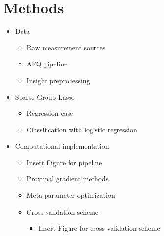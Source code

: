 \section{Methods}

\begin{itemize}
  \item Data
    \begin{itemize}
      \item Raw measurement sources
      \item AFQ pipeline
      \item Insight preprocessing
    \end{itemize}
  \item Sparse Group Lasso
    \begin{itemize}
      \item Regression case
      \item Classification with logistic regression
    \end{itemize}
  \item Computational implementation
    \begin{itemize}
      \item Insert Figure for pipeline
      \item Proximal gradient methods
      \item Meta-parameter optimization
      \item Cross-validation scheme
        \begin{itemize}
          \item Insert Figure for cross-validation scheme
        \end{itemize}
    \end{itemize}
\end{itemize}
